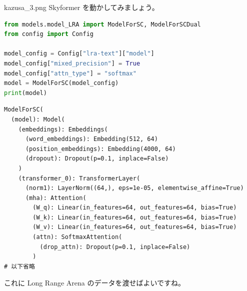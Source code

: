 \documentclass[b5paper,xelatex,ja=standard,10pt]{bxjsarticle}
\begin{document}
\begin{SERIFU}[colback=PaleIris, colbacktitle=PaleIris2]{kazusa_3.png}
Skyformer \cite{YifanChen2021}を動かしてみましょう。
\begin{CODE}[boxrule=0pt,frame hidden]
\begin{lstlisting}[language=python]
from models.model_LRA import ModelForSC, ModelForSCDual
from config import Config

model_config = Config["lra-text"]["model"]
model_config["mixed_precision"] = True
model_config["attn_type"] = "softmax"
model = ModelForSC(model_config)
print(model)
\end{lstlisting}
\end{CODE}

\begin{CODE}[boxrule=0pt,frame hidden,colback=SlateGray2]
\begin{lstlisting}[basicstyle={\ttfamily\small\color{White}}]
ModelForSC(
  (model): Model(
    (embeddings): Embeddings(
      (word_embeddings): Embedding(512, 64)
      (position_embeddings): Embedding(4000, 64)
      (dropout): Dropout(p=0.1, inplace=False)
    )
    (transformer_0): TransformerLayer(
      (norm1): LayerNorm((64,), eps=1e-05, elementwise_affine=True)
      (mha): Attention(
        (W_q): Linear(in_features=64, out_features=64, bias=True)
        (W_k): Linear(in_features=64, out_features=64, bias=True)
        (W_v): Linear(in_features=64, out_features=64, bias=True)
        (attn): SoftmaxAttention(
          (drop_attn): Dropout(p=0.1, inplace=False)
        )
# 以下省略
\end{lstlisting}
\end{CODE}



これに Long Range Arena のデータを渡せばよいですね。
\end{SERIFU}
\end{document}
